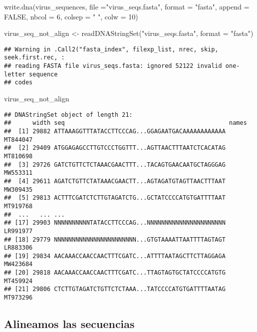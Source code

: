 \documentclass[
]{article}
\newenvironment{Shaded}{\begin{snugshade}}{\end{snugshade}}
\newcommand{\AttributeTok}[1]{\textcolor[rgb]{0.77,0.63,0.00}{#1}}
\newcommand{\ConstantTok}[1]{\textcolor[rgb]{0.00,0.00,0.00}{#1}}
\newcommand{\DecValTok}[1]{\textcolor[rgb]{0.00,0.00,0.81}{#1}}
\newcommand{\FunctionTok}[1]{\textcolor[rgb]{0.00,0.00,0.00}{#1}}
\newcommand{\NormalTok}[1]{#1}
\newcommand{\OtherTok}[1]{\textcolor[rgb]{0.56,0.35,0.01}{#1}}
\newcommand{\StringTok}[1]{\textcolor[rgb]{0.31,0.60,0.02}{#1}}
\begin{document}
\begin{Shaded}
\begin{Highlighting}[]
\FunctionTok{write.dna}\NormalTok{(virus\_sequences,  }\AttributeTok{file =}\StringTok{"virus\_seqs.fasta"}\NormalTok{, }\AttributeTok{format =} \StringTok{"fasta"}\NormalTok{, }\AttributeTok{append =}
\ConstantTok{FALSE}\NormalTok{, }\AttributeTok{nbcol =} \DecValTok{6}\NormalTok{, }\AttributeTok{colsep =} \StringTok{" "}\NormalTok{, }\AttributeTok{colw =} \DecValTok{10}\NormalTok{)}

\NormalTok{virus\_seq\_not\_align }\OtherTok{\textless{}{-}} \FunctionTok{readDNAStringSet}\NormalTok{(}\StringTok{"virus\_seqs.fasta"}\NormalTok{, }\AttributeTok{format =} \StringTok{"fasta"}\NormalTok{)}
\end{Highlighting}
\end{Shaded}

\begin{verbatim}
## Warning in .Call2("fasta_index", filexp_list, nrec, skip, seek.first.rec, :
## reading FASTA file virus_seqs.fasta: ignored 52122 invalid one-letter sequence
## codes
\end{verbatim}

\begin{Shaded}
\begin{Highlighting}[]
\NormalTok{virus\_seq\_not\_align}
\end{Highlighting}
\end{Shaded}

\begin{verbatim}
## DNAStringSet object of length 21:
##      width seq                                              names               
##  [1] 29882 ATTAAAGGTTTATACCTTCCCAG...GGAGAATGACAAAAAAAAAAAA MT844047
##  [2] 29409 ATGGAGAGCCTTGTCCCTGGTTT...AGTTAACTTTAATCTCACATAG MT810698
##  [3] 29726 GATCTGTTCTCTAAACGAACTTT...TACAGTGAACAATGCTAGGGAG MW553311
##  [4] 29611 AGATCTGTTCTATAAACGAACTT...AGTAGATGTAGTTAACTTTAAT MW309435
##  [5] 29813 ACTTTCGATCTCTTGTAGATCTG...GCTATCCCCATGTGATTTTAAT MT919768
##  ...   ... ...
## [17] 29903 NNNNNNNNNNTATACCTTCCCAG...NNNNNNNNNNNNNNNNNNNNNN LR991977
## [18] 29779 NNNNNNNNNNNNNNNNNNNNNNN...GTGTAAAATTAATTTTAGTAGT LR883306
## [19] 29834 AACAAACCAACCAACTTTCGATC...ATTTTAATAGCTTCTTAGGAGA MW423684
## [20] 29818 AACAAACCAACCAACTTTCGATC...TTAGTAGTGCTATCCCCATGTG MT459924
## [21] 29806 CTCTTGTAGATCTGTTCTCTAAA...TATCCCCATGTGATTTTAATAG MT973296
\end{verbatim}

\hypertarget{alineamos-las-secuencias}{%
\subsection{Alineamos las secuencias}\label{alineamos-las-secuencias}}
\end{document}
